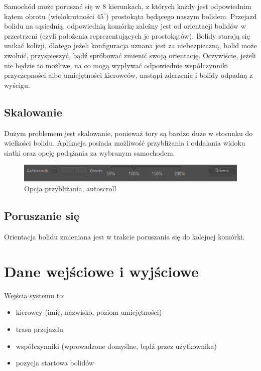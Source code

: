\documentclass{article}
\begin{document}
Samochód może poruszać się w 8 kierunkach, z których każdy jest odpowiednim kątem obrotu (wielokrotności $45^{\circ}$) prostokąta będącego naszym bolidem. Przejazd bolidu na sąsiednią, odpowiednią komórkę zależny jest od orientacji bolidów w przestrzeni (czyli położenia reprezentujących je prostokątów). Bolidy starają się unikać kolizji, dlatego jeżeli konfiguracja uznana jest za niebezpieczną, bolid może zwolnić, przyspieszyć, bądź spróbować zmienić swoją orientację. Oczywiście, jeżeli nie będzie to możliwe, na co mogą wypływać odpowiednie współczynniki przyczepności albo umiejętności kierowców, nastąpi zderzenie i bolidy odpadną z wyścigu.   \\

\subsection{Skalowanie}
Dużym problemem jest skalowanie, ponieważ tory są bardzo duże w stosunku do wielkości bolidu. Aplikacja posiada możliwość przybliżania i oddalania widoku siatki oraz opcję podążania za wybranym samochodem.

\begin{figure}[h]
\begin{center}
\includegraphics[scale=0.8]{scroll.png}
\caption{Opcja przybliżania, autoscroll}
\end{center}
\end{figure}


\subsection{Poruszanie się}
Orientacja bolidu zmieniana jest w trakcie poruszania się do kolejnej komórki.


\section{Dane wejściowe i wyjściowe}
Wejścia systemu to:
\begin{itemize}
\item kierowcy (imię, nazwisko, poziom umiejętności)
\item trasa przejazdu
\item współczynniki (wprowadzone domyślne, bądź przez użytkownika)
\item pozycja startowa bolidów
\end{itemize}
\end{document}
